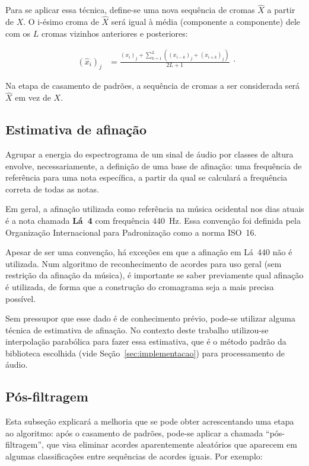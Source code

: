         Para se aplicar essa técnica, define-se uma nova sequência de cromas $\hat{X}$ a partir de $X$. O i-ésimo croma de $\hat{X}$ será igual à média (componente a componente) dele com os $L$ cromas vizinhos anteriores e posteriores:
        
        \[
            \begin{split}
                (\hat{x}_i)_j   &= \frac{(x_i)_j + \sum_{k = 1}^L ((x_{i - k})_j + (x_{i + k})_j)}{2L + 1}
            \end{split}\mbox{.}
        \]
        
        Na etapa de casamento de padrões, a sequência de cromas a ser considerada será $\hat{X}$ em vez de $X$.
        
    \subsection{Estimativa de afinação}
        Agrupar a energia do espectrograma de um sinal de áudio por classes de altura envolve, necessariamente, a definição de uma base de afinação: uma frequência de referência para uma nota específica, a partir da qual se calculará a frequência correta de todas as notas.

        Em geral, a afinação utilizada como referência na música ocidental nos dias atuais é a nota chamada \textbf{Lá~4} com frequência 440~Hz. Essa convenção foi definida pela Organização Internacional para Padronização como a norma ISO~16.

        Apesar de ser uma convenção, há exceções em que a afinação em Lá~440 não é utilizada. Num algoritmo de reconhecimento de acordes para uso geral (sem restrição da afinação da música), é importante se saber previamente qual afinação é utilizada, de forma que a construção do cromagrama seja a mais precisa possível.

        Sem pressupor que esse dado é de conhecimento prévio, pode-se utilizar alguma técnica de estimativa de afinação. No contexto deste trabalho utilizou-se interpolação parabólica para fazer essa estimativa, que é o método padrão da biblioteca escolhida (vide Seção~\ref{sec:implementacao}) para processamento de áudio.

    \subsection{Pós-filtragem}
    \label{subsec:pos-filtragem}

        Esta subseção explicará a melhoria que se pode obter acrescentando uma etapa ao algoritmo: após o casamento de padrões, pode-se aplicar a chamada  ``pós-filtragem'', que visa eliminar acordes aparentemente aleatórios que aparecem em algumas classificações entre sequências de acordes iguais. Por exemplo:
        
